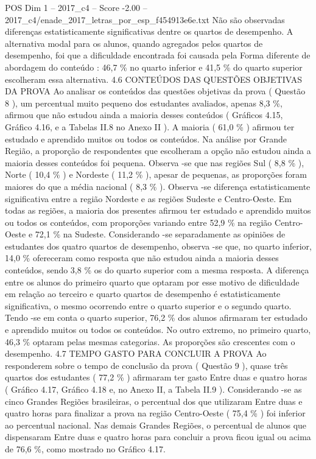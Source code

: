\begin{textsample}{POS Dim 1 – 2017\_c4 – Score -2.00 – 2017\_c4/enade\_2017\_letras\_por\_esp\_f454913e6e.txt}
Não são observadas diferenças estatisticamente significativas dentre os quartos de desempenho.
A alternativa modal para os alunos, quando agregados pelos quartos de desempenho, foi que a dificuldade encontrada foi causada pela Forma diferente de abordagem do conteúdo : 46,7 \% no quarto inferior e 41,5 \% do quarto superior escolheram essa alternativa. 4.6 CONTEÚDOS DAS QUESTÕES OBJETIVAS DA PROVA Ao analisar os conteúdos das questões objetivas da prova ( Questão 8 ), um percentual muito pequeno dos estudantes avaliados, apenas 8,3 \%, afirmou que não estudou ainda a maioria desses conteúdos ( Gráficos 4.15, Gráfico 4.16, e a Tabelas II.8 no Anexo II ).
A maioria ( 61,0 \% ) afirmou ter estudado e aprendido muitos ou todos os conteúdos.
Na análise por Grande Região, a proporção de respondentes que escolheram a opção não estudou ainda a maioria desses conteúdos foi pequena.
Observa -se que nas regiões Sul ( 8,8 \% ), Norte ( 10,4 \% ) e Nordeste ( 11,2 \% ), apesar de pequenas, as proporções foram maiores do que a média nacional ( 8,3 \% ).
Observa -se diferença estatisticamente significativa entre a região Nordeste e as regiões Sudeste e Centro-Oeste.
Em todas as regiões, a maioria dos presentes afirmou ter estudado e aprendido muitos ou todos os conteúdos, com proporções variando entre 52,9 \% na região Centro-Oeste e 72,1 \% na Sudeste.
Considerando -se separadamente as opiniões de estudantes dos quatro quartos de desempenho, observa -se que, no quarto inferior, 14,0 \% ofereceram como resposta que não estudou ainda a maioria desses conteúdos, sendo 3,8 \% os do quarto superior com a mesma resposta.
A diferença entre os alunos do primeiro quarto que optaram por esse motivo de dificuldade em relação ao terceiro e quarto quartos de desempenho é estatisticamente significativa, o mesmo ocorrendo entre o quarto superior e o segundo quarto.
Tendo -se em conta o quarto superior, 76,2 \% dos alunos afirmaram ter estudado e aprendido muitos ou todos os conteúdos.
No outro extremo, no primeiro quarto, 46,3 \% optaram pelas mesmas categorias.
As proporções são crescentes com o desempenho. 4.7 TEMPO GASTO PARA CONCLUIR A PROVA Ao responderem sobre o tempo de conclusão da prova ( Questão 9 ), quase três quartos dos estudantes ( 77,2 \% ) afirmaram ter gasto Entre duas e quatro horas ( Gráfico 4.17, Gráfico 4.18 e, no Anexo II, a Tabela II.9 ).
Considerando -se as cinco Grandes Regiões brasileiras, o percentual dos que utilizaram Entre duas e quatro horas para finalizar a prova na região Centro-Oeste ( 75,4 \% ) foi inferior ao percentual nacional.
Nas demais Grandes Regiões, o percentual de alunos que dispensaram Entre duas e quatro horas para concluir a prova ficou igual ou acima de 76,6 \%, como mostrado no Gráfico 4.17.

\end{textsample}
